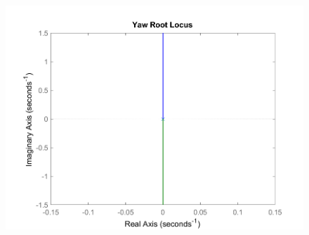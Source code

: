 \documentclass[12pt]{article}
\begin{document}
\begin{figure}[h]
\includegraphics[width=0.75\linewidth]{images/Yaw_rootlocus.png}
\centering
\caption{}
\end{figure}
\end{document}
